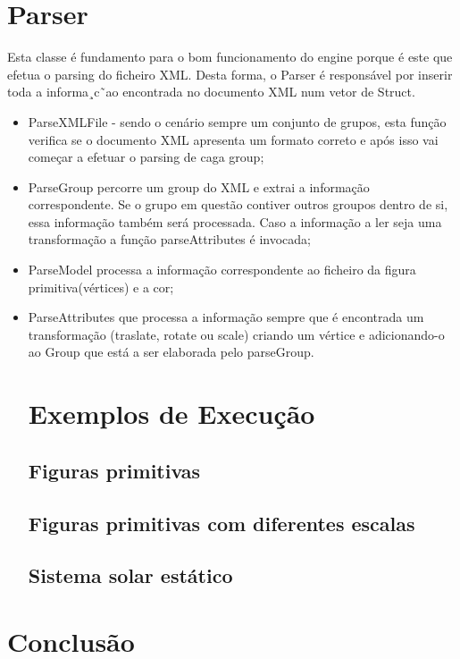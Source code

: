\documentclass[12pt]{article}
\begin{document}
\section{Parser}
Esta classe é fundamento para o bom funcionamento do engine porque é
este que efetua o parsing do ficheiro XML. Desta forma, o Parser é responsável
por inserir toda a informa¸c˜ao encontrada no documento XML num vetor
de Struct.
\begin{itemize}
\item ParseXMLFile - sendo o cenário sempre um conjunto de grupos, esta função verifica se o documento XML apresenta um formato
correto e após isso vai começar a efetuar o parsing de caga group;
\item ParseGroup percorre um group do XML e extrai a informação correspondente. Se o grupo em questão
contiver outros groupos dentro de si, essa informação também será processada. 
Caso a informação a ler seja uma transformação a função parseAttributes é invocada;
\item ParseModel processa a informação correspondente ao ficheiro da figura primitiva(vértices) e a cor;
\item ParseAttributes que processa a informação sempre que é encontrada um transformação (traslate, rotate ou scale) criando
um vértice e adicionando-o ao Group que está a ser elaborada pelo
parseGroup.
\section{Exemplos de Execução}
\subsection{Figuras primitivas}
\subsection{Figuras primitivas com diferentes escalas}
\subsection{Sistema solar estático}

\end{itemize}
\section{Conclusão}
\end{document}
